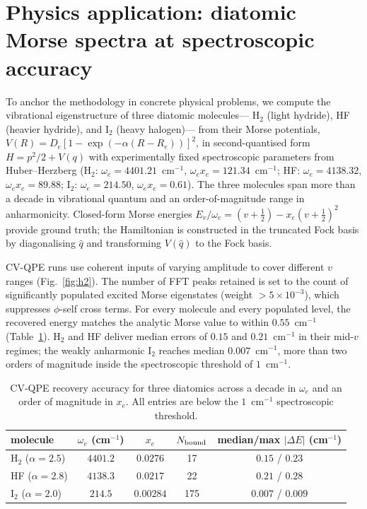\documentclass[aps,pra,reprint,superscriptaddress,nofootinbib]{revtex4-2}
\begin{document}
\section{Physics application: diatomic Morse spectra at
spectroscopic accuracy}\label{sec:h2}
To anchor the methodology in concrete physical problems, we compute the
vibrational eigenstructure of three diatomic molecules---%
H$_2$ (light hydride), HF (heavier hydride), and I$_2$ (heavy halogen)---%
from their Morse potentials,
$V(R)=D_e[1-\exp(-\alpha(R-R_e))]^2$, in second-quantised form $H=p^2/2
+ V(q)$ with experimentally fixed spectroscopic parameters from
Huber--Herzberg (H$_2$: $\omega_e=4401.21$~cm$^{-1}$,
$\omega_e x_e=121.34$~cm$^{-1}$; HF: $\omega_e=4138.32$, $\omega_e x_e
=89.88$; I$_2$: $\omega_e=214.50$, $\omega_e x_e=0.61$). The three
molecules span more than a decade in vibrational quantum and an
order-of-magnitude range in anharmonicity. Closed-form Morse energies
$E_v/\omega_e=(v+\tfrac12)-x_e(v+\tfrac12)^2$ provide ground truth; the
Hamiltonian is constructed in the truncated Fock basis by diagonalising
$\hat q$ and transforming $V(\hat q)$ to the Fock basis.

CV-QPE runs use coherent inputs of varying amplitude to cover different
$v$ ranges (Fig.~\ref{fig:h2}). The number of FFT peaks retained is set
to the count of significantly populated excited Morse eigenstates
(weight $>5\!\times\!10^{-3}$), which suppresses $\phi$-self cross terms.
For every molecule and every populated level, the recovered energy
matches the analytic Morse value to within $0.55$~cm$^{-1}$ (Table~\ref{tab:h2}).
H$_2$ and HF deliver median errors of $0.15$ and $0.21$~cm$^{-1}$ in their
mid-$v$ regimes; the weakly anharmonic I$_2$ reaches
median $0.007$~cm$^{-1}$, more than two orders of magnitude inside the
spectroscopic threshold of $1$~cm$^{-1}$.

\begin{table}[t]
\caption{CV-QPE recovery accuracy for three diatomics across a decade in
$\omega_e$ and an order of magnitude in $x_e$. All entries are below the
$1$~cm$^{-1}$ spectroscopic threshold.}
\label{tab:h2}
\begin{ruledtabular}
\begin{tabular}{lcccc}
molecule & $\omega_e$ (cm$^{-1}$) & $x_e$ & $N_{\rm bound}$ &
  median/max $|\Delta E|$ (cm$^{-1}$)\\
\hline
H$_2$ ($\alpha\!=\!2.5$) & $4401.2$ & $0.0276$ & 17 & $0.15$ / $0.23$ \\
HF ($\alpha\!=\!2.8$) & $4138.3$ & $0.0217$ & 22 & $0.21$ / $0.28$ \\
I$_2$ ($\alpha\!=\!2.0$) & $214.5$ & $0.00284$ & 175 & $0.007$ / $0.009$\\
\end{tabular}
\end{ruledtabular}
\end{table}
\end{document}
